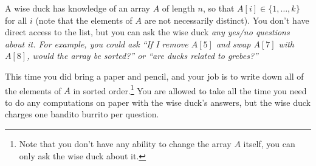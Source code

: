 \documentclass [12pt]{article}
\begin{document}
A wise duck has knowledge of an array $A$ of length $n$, so that $A[i] \in \{1,\ldots ,k\}$ for all $i$ (note that the elements of $A$ are not necessarily distinct). You don't have direct access to the list, but you can ask the wise duck \em any \em yes/no questions about it. For example, you could ask ``If I remove $A[5]$ and swap $A[7]$ with $A[8]$, would the array be sorted?'' or ``are ducks related to grebes?'' 

This time you did bring a paper and pencil, and your job is to write down all of the elements of $A$ in sorted order.\footnote {Note that you don't have any ability to change the array $A$ itself, you can only ask the wise duck about it.} You are allowed to take all the time you need to do any computations on paper with the wise duck's answers, but the wise duck charges one bandito burrito per question. 
\vspace {-.2cm} 
\begin{center} 
\end{center} 
\vspace {-.7cm} 
\end{document}
